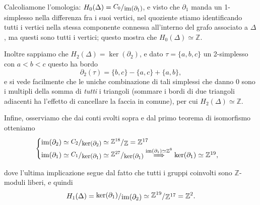 \documentclass[a4paper]{article}
\newcommand{\Z}{\mathbb{Z}}
\newcommand{\im}{\operatorname{im}}
\newcommand{\ssfrac}[2]{
	\raisebox{+0.3ex}{$#1$}
	/
	\raisebox{-0.3ex}{$#2$}
}
\newcommand{\sfrac}[2]{
	\raisebox{+0.3ex}{\scalebox{0.9}{$#1$}}
	/
	\raisebox{-0.3ex}{\scalebox{0.9}{$#2$}}
}
\theoremstyle{definition}
\theoremstyle{definition}
\theoremstyle{remark}
\theoremstyle{definition}
\begin{document}
Calcoliamone l'omologia: $H_0(\Delta) = \sfrac{C_0}{\im(\partial_1)}$, e visto che $\partial_1$ manda un 1-simplesso nella differenza fra i suoi vertici, nel quoziente stiamo
identificando tutti i vertici nella stessa componente connessa all'interno del grafo associato a $\Delta$, ma questi sono tutti i vertici; questo mostra che $H_0(\Delta)\simeq\Z$.

Inoltre sappiamo che $H_2(\Delta)=\ker(\partial_2)$, e dato $\tau=\{a,b,c\}$ un 2-simplesso con $a<b<c$ questo ha bordo
\[\partial_2(\tau)=\{b,c\}-\{a,c\}+\{a,b\},\] e si vede facilmente che
le uniche combinazione di
tali simplessi che danno $0$ sono i multipli della somma di \textit{tutti} i triangoli (sommare i bordi di due triangoli adiacenti ha l'effetto di cancellare la faccia in comune), per cui
$H_2(\Delta) \simeq \Z$.

Infine, osserviamo che dai conti svolti sopra e dal primo teorema di isomorfismo otteniamo
\[
\begin{cases}
    \im(\partial_2) \simeq \sfrac{C_2}{\ker(\partial_2)} \simeq \sfrac{\Z^{18}}{\Z} = \Z^{17} \\
    \im(\partial_1) \simeq \sfrac{C_1}{\ker(\partial_1)}\simeq \sfrac{\Z^{27}}{\ker(\partial_1)} \overset{\im(\partial_1)\simeq\Z^8 }{\implies} \ker(\partial_1) \simeq \Z^{19},
\end{cases}
\]

dove l'ultima implicazione segue dal fatto che tutti i gruppi coinvolti sono $\Z$-moduli liberi, e quindi
\[
    H_1(\Delta)=\ssfrac{\ker(\partial_1)}{\im(\partial_2)} \simeq \ssfrac{\Z^{19}}{\Z^{17}} = \Z^2
.\]
\end{document}
